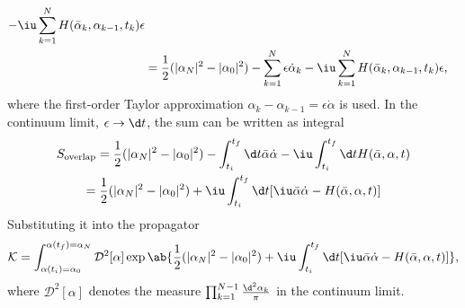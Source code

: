 \begin{solution}
\begin{enumext}
\begin{align*}
        - \iu \sum_{k=1}^N H(\bar\alpha_k, \alpha_{k-1}, t_k) \epsilon\\
    & = \frac12(|\alpha_N|^2 - |\alpha_0|^2)
        - \sum_{k=1}^N \epsilon \dot\alpha_k
        - \iu \sum_{k=1}^N H(\bar\alpha_k, \alpha_{k-1}, t_k) \epsilon,
    \end{align*}
    where the first-order Taylor
    approximation $\alpha_k - \alpha_{k-1} = \epsilon \dot\alpha$ is used.
    In the continuum limit, $\epsilon \to \d t$, the sum can be written
    as integral
    \begin{multline*}
      S_\text{overlap} = \frac12(|\alpha_N|^2 - |\alpha_0|^2)
        - \int_{t_i}^{t_f} \d t \bar\alpha \dot\alpha
        - \iu \int_{t_i}^{t_f} \d t H(\bar\alpha, \alpha, t)\\
      = \frac12(|\alpha_N|^2 - |\alpha_0|^2) + \iu \int_{t_i}^{t_f} \d t
          [\iu \bar\alpha \dot\alpha - H(\bar\alpha, \alpha, t)]
    \end{multline*}
    Substituting it into the propagator
    \[
      \mathcal K = \int_{\alpha(t_i)=\alpha_0}^{\alpha(t_f)=\alpha_N}
      \mathcal D^2[\alpha]
      \exp\ab\{\frac12(|\alpha_N|^2 - |\alpha_0|^2) + \iu \int_{t_i}^{t_f} \d t
            [\iu \bar\alpha \dot\alpha - H(\bar\alpha, \alpha, t)]\},
    \]
    where $\mathcal D^2[\alpha]$ denotes the
    measure $\prod_{k=1}^{N-1} \frac{\d^2\alpha_k}{\pi}$ in the continuum limit.


\end{enumext}
\end{solution}
